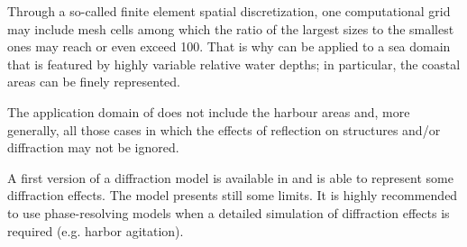 Through a so-called finite element spatial discretization, one computational grid may include mesh cells among which the ratio of the largest sizes to the smallest ones may reach or even exceed 100. That is why \tomawac can be applied to a sea domain that is featured by highly variable relative water depths; in particular, the coastal areas can be finely represented.

The application domain of \tomawac does not include the harbour areas and, more generally, all those cases in which the effects of reflection on structures and/or diffraction may not be ignored.

A first version of a diffraction model is available in \tomawac and is able to represent some diffraction effects. The model presents still some limits. It is highly recommended to use phase-resolving models when a detailed simulation of diffraction effects is required (e.g. harbor agitation).

